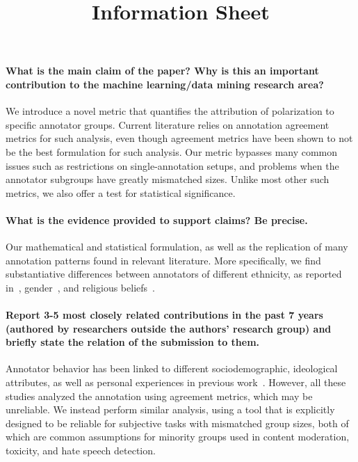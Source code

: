 \documentclass[pdflatex,sn-nature]{sn-jnl}
\begin{document}
		\title{Information Sheet}
	
	\maketitle
	
	\paragraph{What is the main claim of the paper? Why is this an important contribution to the machine learning/data mining research area?}
	
	We introduce a novel metric that quantifies the attribution of polarization to specific annotator groups. Current literature relies on annotation agreement metrics for such analysis, even though agreement metrics have been shown to not be the best formulation for such analysis. Our metric bypasses many common issues such as restrictions on single-annotation setups, and problems when the annotator subgroups have greatly mismatched sizes. Unlike most other such metrics, we also offer a test for statistical significance.
	
	\paragraph{What is the evidence provided to support claims? Be precise.}
	Our mathematical and statistical formulation, as well as the replication of many annotation patterns found in relevant literature. More specifically, we find substantiative differences between annotators of different ethnicity, as reported in~\cite{goyal2022your}, gender~\cite{goyal2022your, binns2017like, giorgi2025human, al2020identifying}, and religious beliefs~\cite{sachdeva2022assessing}.
	
	\paragraph{Report 3-5 most closely related contributions in the past 7 years (authored by researchers outside the authors’ research group) and briefly state the relation of the submission to them.}
	Annotator behavior has been linked to different sociodemographic, ideological attributes, as well as personal experiences in previous work~\cite{ kumar-et-al-2021, sachdeva2022assessing, goyal2022your, binns2017like}. However, all these studies analyzed the annotation using agreement metrics, which may be unreliable. We instead perform similar analysis, using a tool that is explicitly designed to be reliable for subjective tasks with mismatched group sizes, both of which are common assumptions for minority groups used in content moderation, toxicity, and hate speech detection.
	
\end{document}
